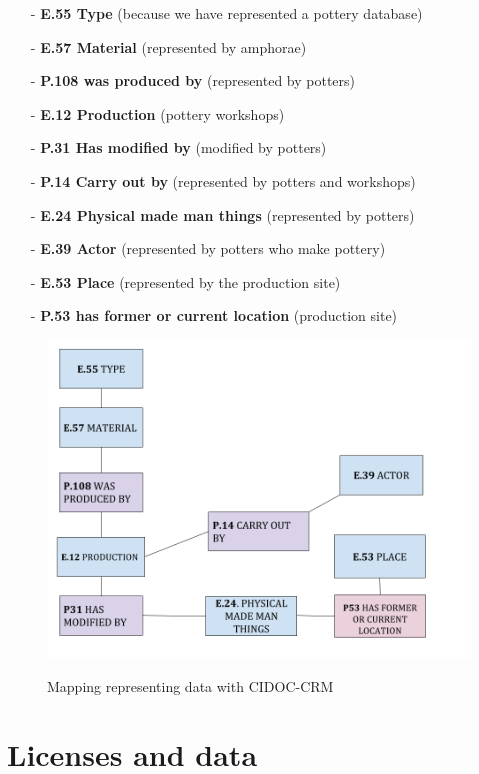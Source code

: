 \documentclass[10pt,a4paper]{article}
\begin{document}
\begin{itemize}
\item[-] \textbf{E.55 Type} (because we have represented a pottery database)
\item[-] \textbf{E.57 Material} (represented by amphorae)
\item[-] \textbf{P.108 was produced by} (represented by potters)
\item[-] \textbf{E.12 Production} (pottery workshops)
\item[-] \textbf{P.31 Has modified by} (modified by potters)
\item[-] \textbf{P.14 Carry out by} (represented by potters and workshops)
\item[-] \textbf{E.24 Physical made man things} (represented by potters)
\item[-] \textbf{E.39 Actor} (represented by potters who make pottery)
\item[-] \textbf{E.53 Place} (represented by the production site)
\item[-] \textbf{P.53 has former or current location} (production site)
\end{itemize}


\begin{figure}[hdp]
\centering
\includegraphics[scale=0.50]{sparex.png}
\label{sparex}
\caption{Mapping representing data with CIDOC-CRM}
\end{figure}


\section{Licenses and data}
\end{document}
